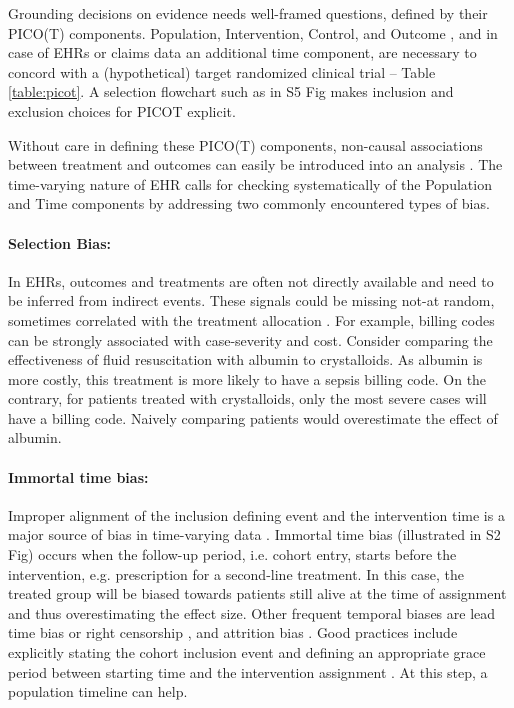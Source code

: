 \documentclass[10pt,letterpaper]{article}
\begin{document}
Grounding decisions on evidence needs well-framed questions, defined by their
PICO(T) components. Population, Intervention, Control, and Outcome
\cite{richardson1995well,riva2012your}, and in case of EHRs or claims data an
additional time component, are necessary to concord with a (hypothetical) target
randomized clinical trial \cite{hernan_using_2016,wang2023emulation} -- Table
\ref{table:picot}. A selection flowchart such as in
S5 Fig makes inclusion and exclusion choices for PICOT explicit.

Without care in defining these PICO(T) components, non-causal associations
between treatment and outcomes can easily be introduced into an analysis
\cite{catalogofbias}. The time-varying nature of EHR calls for checking
systematically of the Population and Time components by addressing two commonly
encountered types of bias.


\paragraph{Selection Bias:} In EHRs, outcomes and treatments are often not
directly available and need to be inferred from indirect events. These signals
could be missing not-at random, sometimes correlated with the treatment
allocation \cite{weiskopf2023healthcare}. For example, billing codes can be
strongly associated with case-severity and cost. Consider comparing the
effectiveness of fluid resuscitation with albumin to crystalloids. As albumin is
more costly, this treatment is more likely to have a sepsis billing code. On the
contrary, for patients treated with crystalloids, only the most severe cases
will have a billing code. Naively comparing patients would overestimate the
effect of albumin.

\paragraph{Immortal time bias:} Improper alignment of the inclusion defining
event and the intervention time is a major source of bias in time-varying data
\cite{suissa2008immortal,hernan2016specifying,wang2022understanding}. Immortal time bias (illustrated in S2 Fig) occurs when the follow-up period,
i.e. cohort entry, starts before the intervention, e.g. prescription for a
second-line treatment. In this case, the treated group will be biased towards
patients still alive at the time of assignment and thus overestimating the
effect size. Other frequent temporal biases are lead time bias
\cite{Oke2021leadtimebias,fu2021timing} or right censorship  \cite{hernan2016specifying}, and attrition bias
\cite{Bankhead2017attritionbias}. Good
practices include explicitly stating the cohort inclusion event   \cite[Chapter~10:Defining Cohorts]{ohdsi2019book} and defining
an appropriate grace period between starting time and the intervention
assignment \cite{hernan2016specifying}. At this step, a population timeline can
help.
\end{document}
